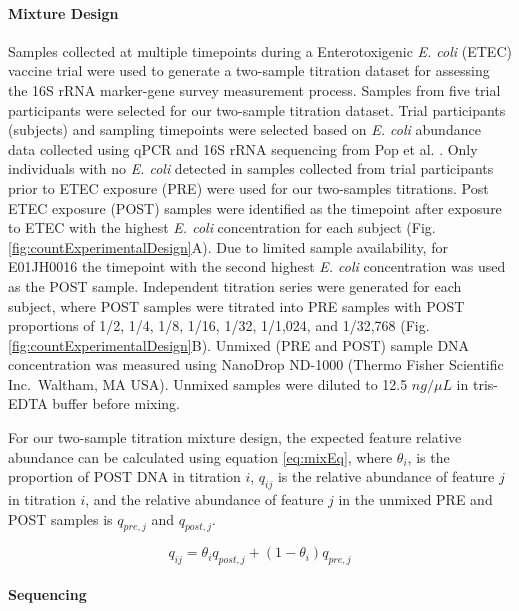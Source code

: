 \documentclass[linenumbers]{bmcart}
\begin{document}
\paragraph*{Mixture Design}
Samples collected at multiple timepoints during a Enterotoxigenic
\emph{E. coli} (ETEC) vaccine trial \cite{harro2011refinement} were
used to generate a two-sample titration dataset for assessing the 16S
rRNA marker-gene survey measurement process. Samples from five trial
participants were selected for our two-sample titration dataset. Trial
participants (subjects) and sampling timepoints were selected based on
\emph{E. coli} abundance data collected using qPCR and 16S rRNA
sequencing from Pop et al. \cite{pop2016individual}. Only individuals with no
\emph{E. coli} detected in samples collected from trial participants
prior to ETEC exposure (PRE) were used for our two-samples titrations.
Post ETEC exposure (POST) samples were identified as the timepoint after
exposure to ETEC with the highest \emph{E. coli} concentration for each
subject (Fig. \ref{fig:countExperimentalDesign}A). Due to limited sample
availability, for E01JH0016 the timepoint with the second highest
\emph{E. coli} concentration was used as the POST sample. Independent
titration series were generated for each subject, where POST samples
were titrated into PRE samples with POST proportions of 1/2, 1/4, 1/8,
1/16, 1/32, 1/1,024, and 1/32,768 (Fig.
\ref{fig:countExperimentalDesign}B). Unmixed (PRE and POST) sample DNA
concentration was measured using NanoDrop ND-1000 (Thermo Fisher
Scientific Inc.~Waltham, MA USA). Unmixed samples were diluted to 12.5
\(ng/\mu L\) in tris-EDTA buffer before mixing.

For our two-sample titration mixture design, the expected feature
relative abundance can be calculated using equation \eqref{eq:mixEq},
where \(\theta_i\), is the proportion of POST DNA in titration \(i\),
\(q_{ij}\) is the relative abundance of feature \(j\) in titration
\(i\), and the relative abundance of feature \(j\) in the unmixed PRE
and POST samples is \(q_{pre,j}\) and \(q_{post,j}\).

\begin{equation}
  q_{ij} = \theta_i q_{post,j} + (1 - \theta_i) q_{pre,j}
  \label{eq:mixEq}
\end{equation}

\paragraph*{Sequencing}
\end{document}
